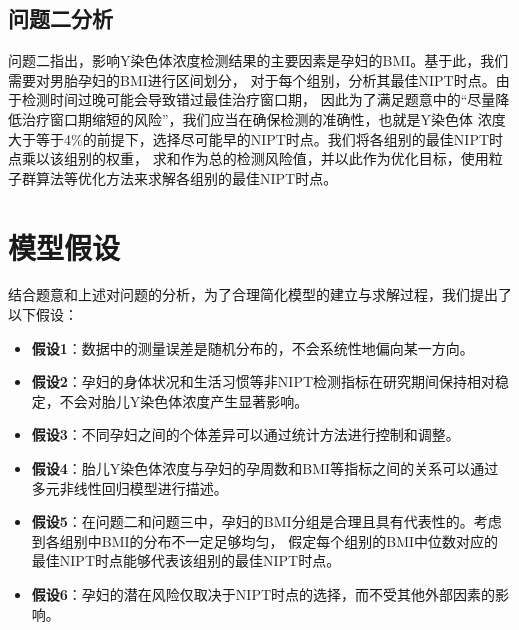 \documentclass{cumcmthesis}
\begin{document}
        \subsection{问题二分析}
        问题二指出，影响Y染色体浓度检测结果的主要因素是孕妇的BMI。基于此，我们需要对男胎孕妇的BMI进行区间划分，
        对于每个组别，分析其最佳NIPT时点。由于检测时间过晚可能会导致错过最佳治疗窗口期，
        因此为了满足题意中的“尽量降低治疗窗口期缩短的风险”，我们应当在确保检测的准确性，也就是Y染色体
        浓度大于等于4\%的前提下，选择尽可能早的NIPT时点。我们将各组别的最佳NIPT时点乘以该组别的权重，
        求和作为总的检测风险值，并以此作为优化目标，使用粒子群算法等优化方法来求解各组别的最佳NIPT时点。
        \par
        

        
        \section{模型假设}
        结合题意和上述对问题的分析，为了合理简化模型的建立与求解过程，我们提出了以下假设：
        \begin{itemize}
            \item \textbf{假设1}：数据中的测量误差是随机分布的，不会系统性地偏向某一方向。
            \item \textbf{假设2}：孕妇的身体状况和生活习惯等非NIPT检测指标在研究期间保持相对稳定，不会对胎儿Y染色体浓度产生显著影响。
            \item \textbf{假设3}：不同孕妇之间的个体差异可以通过统计方法进行控制和调整。
            \item \textbf{假设4}：胎儿Y染色体浓度与孕妇的孕周数和BMI等指标之间的关系可以通过多元非线性回归模型进行描述。
            \item \textbf{假设5}：在问题二和问题三中，孕妇的BMI分组是合理且具有代表性的。考虑到各组别中BMI的分布不一定足够均匀，
            假定每个组别的BMI中位数对应的最佳NIPT时点能够代表该组别的最佳NIPT时点。
            \item \textbf{假设6}：孕妇的潜在风险仅取决于NIPT时点的选择，而不受其他外部因素的影响。
        \end{itemize}
\end{document}
